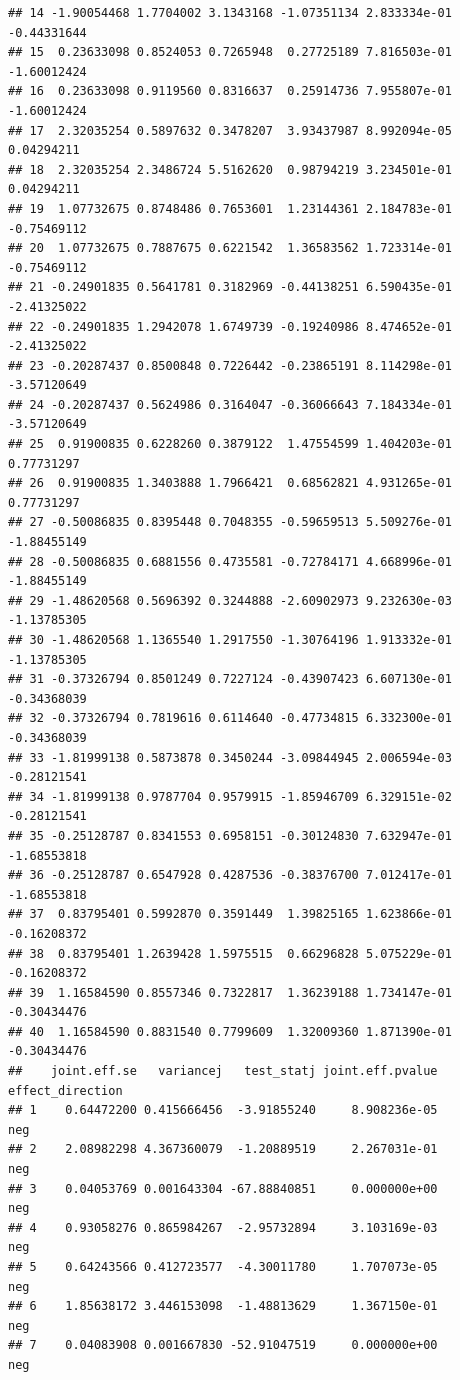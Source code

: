 \documentclass[
]{article}
\begin{document}
\begin{verbatim}
## 14 -1.90054468 1.7704002 3.1343168 -1.07351134 2.833334e-01 -0.44331644
## 15  0.23633098 0.8524053 0.7265948  0.27725189 7.816503e-01 -1.60012424
## 16  0.23633098 0.9119560 0.8316637  0.25914736 7.955807e-01 -1.60012424
## 17  2.32035254 0.5897632 0.3478207  3.93437987 8.992094e-05  0.04294211
## 18  2.32035254 2.3486724 5.5162620  0.98794219 3.234501e-01  0.04294211
## 19  1.07732675 0.8748486 0.7653601  1.23144361 2.184783e-01 -0.75469112
## 20  1.07732675 0.7887675 0.6221542  1.36583562 1.723314e-01 -0.75469112
## 21 -0.24901835 0.5641781 0.3182969 -0.44138251 6.590435e-01 -2.41325022
## 22 -0.24901835 1.2942078 1.6749739 -0.19240986 8.474652e-01 -2.41325022
## 23 -0.20287437 0.8500848 0.7226442 -0.23865191 8.114298e-01 -3.57120649
## 24 -0.20287437 0.5624986 0.3164047 -0.36066643 7.184334e-01 -3.57120649
## 25  0.91900835 0.6228260 0.3879122  1.47554599 1.404203e-01  0.77731297
## 26  0.91900835 1.3403888 1.7966421  0.68562821 4.931265e-01  0.77731297
## 27 -0.50086835 0.8395448 0.7048355 -0.59659513 5.509276e-01 -1.88455149
## 28 -0.50086835 0.6881556 0.4735581 -0.72784171 4.668996e-01 -1.88455149
## 29 -1.48620568 0.5696392 0.3244888 -2.60902973 9.232630e-03 -1.13785305
## 30 -1.48620568 1.1365540 1.2917550 -1.30764196 1.913332e-01 -1.13785305
## 31 -0.37326794 0.8501249 0.7227124 -0.43907423 6.607130e-01 -0.34368039
## 32 -0.37326794 0.7819616 0.6114640 -0.47734815 6.332300e-01 -0.34368039
## 33 -1.81999138 0.5873878 0.3450244 -3.09844945 2.006594e-03 -0.28121541
## 34 -1.81999138 0.9787704 0.9579915 -1.85946709 6.329151e-02 -0.28121541
## 35 -0.25128787 0.8341553 0.6958151 -0.30124830 7.632947e-01 -1.68553818
## 36 -0.25128787 0.6547928 0.4287536 -0.38376700 7.012417e-01 -1.68553818
## 37  0.83795401 0.5992870 0.3591449  1.39825165 1.623866e-01 -0.16208372
## 38  0.83795401 1.2639428 1.5975515  0.66296828 5.075229e-01 -0.16208372
## 39  1.16584590 0.8557346 0.7322817  1.36239188 1.734147e-01 -0.30434476
## 40  1.16584590 0.8831540 0.7799609  1.32009360 1.871390e-01 -0.30434476
##    joint.eff.se   variancej   test_statj joint.eff.pvalue effect_direction
## 1    0.64472200 0.415666456  -3.91855240     8.908236e-05              neg
## 2    2.08982298 4.367360079  -1.20889519     2.267031e-01              neg
## 3    0.04053769 0.001643304 -67.88840851     0.000000e+00              neg
## 4    0.93058276 0.865984267  -2.95732894     3.103169e-03              neg
## 5    0.64243566 0.412723577  -4.30011780     1.707073e-05              neg
## 6    1.85638172 3.446153098  -1.48813629     1.367150e-01              neg
## 7    0.04083908 0.001667830 -52.91047519     0.000000e+00              neg

\end{verbatim}
\end{document}
